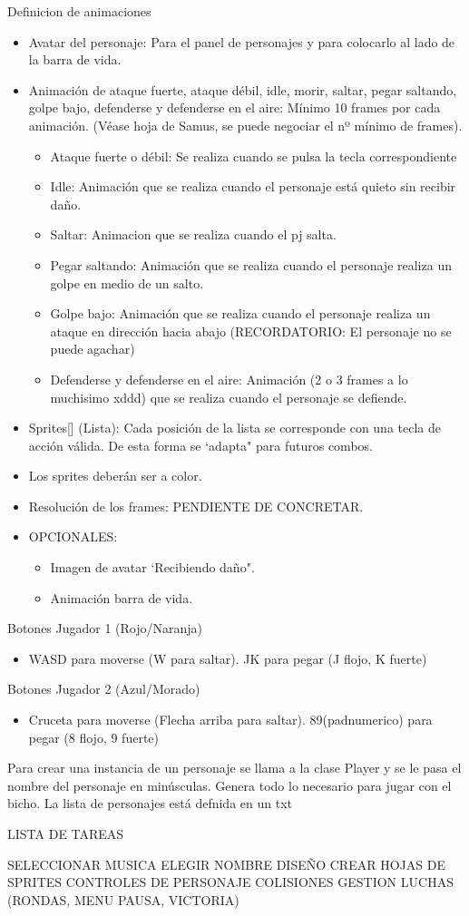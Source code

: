 \documentclass[10pt,a4paper,titlepage]{article}
\begin{document}
Definicion de animaciones 
\begin{itemize}
	\item Avatar del personaje: Para el panel de personajes y para colocarlo al lado de la barra de vida.
	\item Animación de ataque fuerte, ataque débil, idle, morir, saltar, pegar saltando, golpe bajo, defenderse y defenderse en el aire: Mínimo 10 frames por cada animación. (Véase hoja de Samus, se puede negociar el nº mínimo de frames).
	\begin{itemize}
		\item Ataque fuerte o débil: Se realiza cuando se pulsa la tecla correspondiente
		\item Idle: Animación que se realiza cuando el personaje está quieto sin recibir daño.
		\item Saltar: Animacion que se realiza cuando el pj salta.
		\item Pegar saltando: Animación que se realiza cuando el personaje realiza un golpe en medio de un salto.
		\item Golpe bajo: Animación que se realiza cuando el personaje realiza un ataque en dirección hacia abajo (RECORDATORIO: El personaje no se puede agachar)
		\item Defenderse y defenderse en el aire: Animación (2 o 3 frames a lo muchisimo xddd) que se realiza cuando el personaje se defiende.
	\end{itemize}
	\item Sprites[] (Lista): Cada posición de la lista se corresponde con una tecla de acción válida. De esta forma se `adapta" para futuros combos.
	\item Los sprites deberán ser a color.
	\item Resolución de los frames: PENDIENTE DE CONCRETAR.
	\item OPCIONALES: 
	\begin{itemize}
		\item Imagen de avatar `Recibiendo daño".
		\item Animación barra de vida.
	\end{itemize}
\end{itemize}


Botones Jugador 1 (Rojo/Naranja)
\begin{itemize}
	\item WASD para moverse (W para saltar). JK para pegar (J flojo, K fuerte)
\end{itemize}
Botones Jugador 2 (Azul/Morado)
\begin{itemize}
	\item Cruceta para moverse (Flecha arriba para saltar). 89(padnumerico) para pegar (8 flojo, 9 fuerte)
\end{itemize}

Para crear una instancia de un personaje se llama a la clase Player y se le pasa el nombre del personaje en minúsculas. Genera todo lo necesario para jugar con el bicho.
La lista de personajes está defnida en un txt


LISTA DE TAREAS

SELECCIONAR MUSICA
ELEGIR NOMBRE
DISEÑO
CREAR HOJAS DE SPRITES
CONTROLES DE PERSONAJE
COLISIONES
GESTION LUCHAS (RONDAS, MENU PAUSA, VICTORIA)
\end{document}
